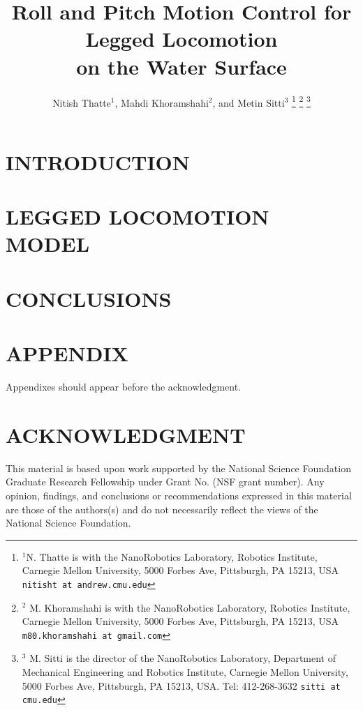 \documentclass[letterpaper, 10 pt, conference]{ieeeconf}  %
\title{\LARGE \bf
Roll and Pitch Motion Control for Legged Locomotion \\ on the Water Surface
}
\author{Nitish Thatte$^{1}$, Mahdi Khoramshahi$^{2}$, and Metin Sitti$^{3}$%
\thanks{$^{1}$N. Thatte is with the NanoRobotics Laboratory, Robotics Institute, Carnegie Mellon University, 5000 Forbes Ave, Pittsburgh, PA 15213, USA 
	{\tt\small nitisht at andrew.cmu.edu}}%
\thanks{$^{2}$ M. Khoramshahi is with the NanoRobotics Laboratory, Robotics Institute, Carnegie Mellon University, 5000 Forbes Ave, Pittsburgh, PA 15213, USA 
	{\tt\small m80.khoramshahi at gmail.com}}
\thanks{$^{3}$ M. Sitti is the director of the NanoRobotics Laboratory, Department of Mechanical Engineering and Robotics Institute, Carnegie Mellon University, 5000 Forbes Ave, Pittsburgh, PA 15213, USA. Tel: 412-268-3632
	{\tt\small sitti at cmu.edu}}
}
\begin{document}
\maketitle
\thispagestyle{empty}
\pagestyle{empty}

\begin{abstract}
	
\end{abstract}

\section{INTRODUCTION}

\section{LEGGED LOCOMOTION MODEL}


\section{CONCLUSIONS}



\section*{APPENDIX}

Appendixes should appear before the acknowledgment.

\section*{ACKNOWLEDGMENT}

This material is based upon work supported by the National Science Foundation Graduate Research Fellowship under Grant No. (NSF grant number). Any opinion, findings, and conclusions or recommendations expressed in this material are those of the authors(s) and do not necessarily reflect the views of the National Science Foundation.



\end{document}
